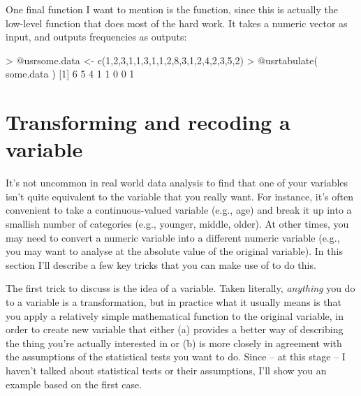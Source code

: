 
One final function I want to mention is the  function, since this is actually the low-level function that does most of the hard work. It takes a numeric vector as input, and outputs frequencies as outputs:
\begin{rblock1}
> @usr{some.data <- c(1,2,3,1,1,3,1,1,2,8,3,1,2,4,2,3,5,2)}
> @usr{tabulate( some.data )}
[1] 6 5 4 1 1 0 0 1
\end{rblock1}



\section{Transforming and recoding a variable~\label{sec:transform}}

It's not uncommon in real world data analysis to find that one of your variables isn't quite equivalent to the variable that you really want. For instance, it's often convenient to take a continuous-valued variable (e.g., age) and break it up into a smallish number of categories (e.g., younger, middle, older). At other times, you may need to convert a numeric variable into a different numeric variable (e.g., you may want to analyse at the absolute value of the original variable). In this section I'll describe a few key tricks that you can make use of to do this.




The first trick to discuss is the idea of  a variable. Taken literally, {\it anything} you do to a variable is a transformation, but in practice what it usually means is that you apply a relatively simple mathematical function to the original variable, in order to create new variable that either (a) provides a better way of describing the thing you're actually interested in or (b) is more closely in agreement with the assumptions of the statistical tests you want to do.  Since -- at this stage -- I haven't talked about statistical tests or their assumptions, I'll show you an example based on the first case. 

